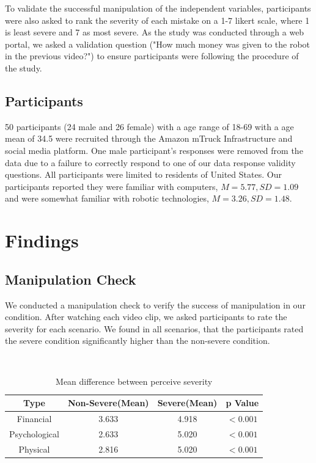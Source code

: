 \documentclass{sigchi}
\begin{document}
To validate the successful manipulation of the independent variables, participants were also asked to rank the severity of each mistake on a 1-7 likert scale, where 1 is least severe and 7 as most severe. As the study was conducted through a web portal, we asked a validation question ("How much money was given to the robot in the previous video?") to ensure participants were following the procedure of the study.

\subsection{Participants}
50 participants (24 male and 26 female) with a age range of 18-69 with a age mean of 34.5 were recruited through the Amazon mTruck Infrastructure and social media platform. One male participant's responses were removed from the data due to a failure to correctly respond to one of our data response validity questions. All participants were limited to residents of United States. Our participants reported they were familiar with computers, $M=5.77, SD=1.09$ and were somewhat familiar with robotic technologies, $M=3.26, SD=1.48$.
\section{Findings}
\subsection{Manipulation Check}
We conducted a manipulation check to verify the success of manipulation in our condition. After watching each video clip, we asked participants to rate the severity for each scenario. We found in all scenarios, that the participants rated the severe condition significantly higher than the non-severe condition.

\hspace{1 mm} \\
\begin{table}
  \centering
  \begin{tabular}{cccc}
    Type & Non-Severe(Mean) & Severe(Mean) & p Value \\
    \hline
    Financial & 3.633 & 4.918 & $ < 0.001$ \\
    Psychological & 2.633 & 5.020 & $ < 0.001$ \\
    Physical & 2.816 & 5.020 & $ < 0.001$ \\
    \hline
  \end{tabular}
  \caption{Mean difference between perceive severity}
  \label{tab:table1}
\end{table}
\end{document}
